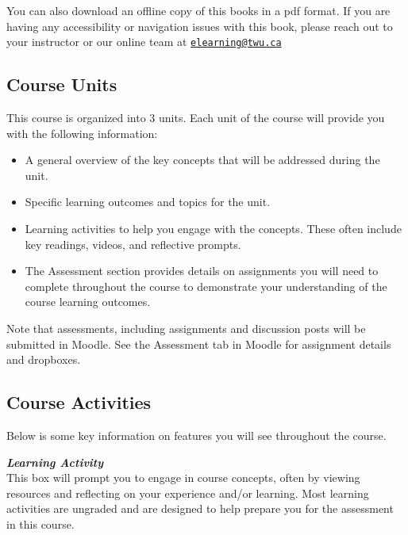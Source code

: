 \documentclass[
]{book}
\providecommand{\tightlist}{%
  \setlength{\itemsep}{0pt}\setlength{\parskip}{0pt}}
\begin{document}
You can also download an offline copy of this books in a pdf format. If you are having any accessibility or navigation issues with this book, please reach out to your instructor or our online team at \href{mailto:elearning@twu.ca}{\nolinkurl{elearning@twu.ca}}

\hypertarget{course-units}{%
\subsection*{Course Units}\label{course-units}}

This course is organized into 3 units. Each unit of the course will provide you with the following information:

\begin{itemize}
\tightlist
\item
  A general overview of the key concepts that will be addressed during the unit.\\
\item
  Specific learning outcomes and topics for the unit.\\
\item
  Learning activities to help you engage with the concepts. These often include key readings, videos, and reflective prompts.\\
\item
  The Assessment section provides details on assignments you will need to complete throughout the course to demonstrate your understanding of the course learning outcomes.
\end{itemize}

\begin{caution}
Note that assessments, including assignments and discussion posts will
be submitted in Moodle. See the Assessment tab in Moodle for assignment
details and dropboxes.
\end{caution}

\hypertarget{course-activities}{%
\subsection*{Course Activities}\label{course-activities}}

Below is some key information on features you will see throughout the course.

\begin{reflect}
\textbf{\emph{Learning Activity}}\\
This box will prompt you to engage in course concepts, often by viewing
resources and reflecting on your experience and/or learning. Most
learning activities are ungraded and are designed to help prepare you
for the assessment in this course.
\end{reflect}
\end{document}
